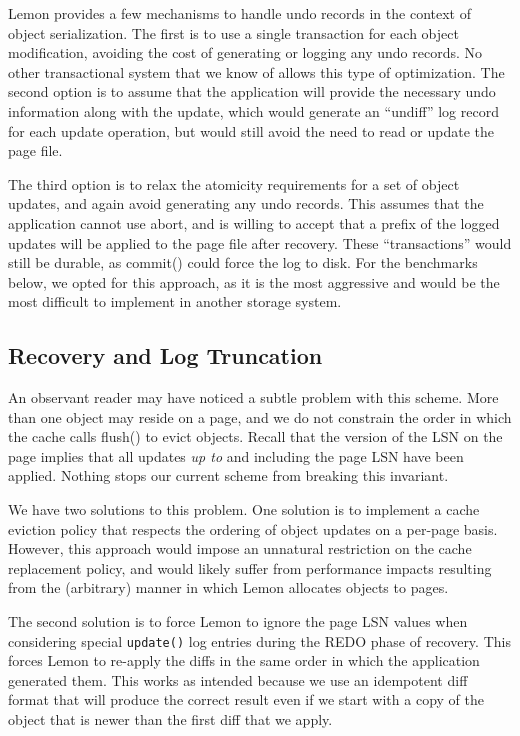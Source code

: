 \documentclass[letterpaper,twocolumn,english]{article}
\newcommand{\yad}{Lemon\xspace}
\begin{document}
\yad provides a few mechanisms to handle undo records in the context
of object serialization. The first is to use a single transaction for
each object modification, avoiding the cost of generating or logging
any undo records. No other transactional system that we know of allows
this type of optimization. The second option is to assume that the
application will provide the necessary undo information along with the
update, which would generate an ``undiff'' log record for each update
operation, but would still avoid the need to read or update the page
file.

The third option is to relax the atomicity requirements for a set of
object updates, and again avoid generating any undo records. This
assumes that the application cannot use abort, and is willing to
accept that a prefix of the logged updates will be applied to the page
file after recovery. These ``transactions'' would still be durable, as
commit() could force the log to disk. For the benchmarks below, we
opted for this approach, as it is the most aggressive and would be the
most difficult to implement in another storage system.

\subsection{Recovery and Log Truncation}

An observant reader may have noticed a subtle problem with this
scheme.  More than one object may reside on a page, and we do not
constrain the order in which the cache calls flush() to evict objects.
Recall that the version of the LSN on the page implies that all
updates {\em up to} and including the page LSN have been applied.
Nothing stops our current scheme from breaking this invariant.  

We have two solutions to this problem.  One solution is to
implement a cache eviction policy that respects the ordering of object
updates on a per-page basis.  
However, this approach would impose an unnatural restriction on the
cache replacement policy, and would likely suffer from performance
impacts resulting from the (arbitrary) manner in which \yad allocates
objects to pages.

The second solution is to 
force \yad to ignore the page LSN values when considering
special {\tt update()} log entries during the REDO phase of recovery.  This
forces \yad to re-apply the diffs in the same order in which the application
generated them.  This works as intended because we use an
idempotent diff format that will produce the correct result even if we
start with a copy of the object that is newer than the first diff that
we apply.
\end{document}
